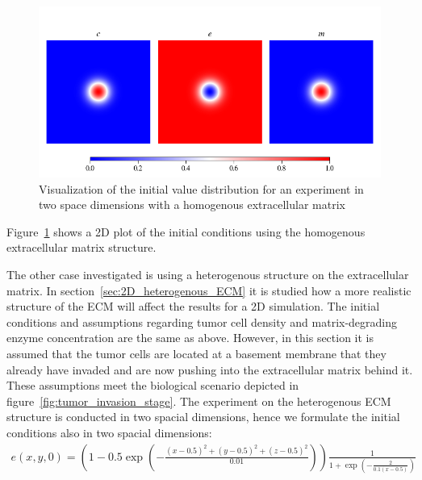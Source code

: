\begin{figure}[ht!]
    \centering
    \includegraphics[width=\textwidth]{resources/images/2D_initial_conditions_homogenous_ECM.png}
    \caption{Visualization of the initial value distribution for an experiment in two space dimensions with a homogenous extracellular matrix}
    \label{fig:2D_homogenous_ECM_initial}
\end{figure}
Figure~\ref{fig:2D_homogenous_ECM_initial} shows a 2D plot of the initial conditions using the homogenous extracellular matrix structure.

The other case investigated is using a heterogenous structure on the extracellular matrix. In section~\ref{sec:2D_heterogenous_ECM} it is studied how a more realistic structure of the ECM will affect the results for a 2D simulation. The initial conditions and assumptions regarding tumor cell density and matrix-degrading enzyme concentration are the same as above. However, in this section it is assumed that the tumor cells are located at a basement membrane that they already have invaded and are now pushing into the extracellular matrix behind it. These assumptions meet the biological scenario depicted in figure~\ref{fig:tumor_invasion_stage}. The experiment on the heterogenous ECM structure is conducted in two spacial dimensions, hence we formulate the initial conditions also in two spacial dimensions:
\begin{align*}
    e(x,y,0) = (1 - 0.5 \exp(-\frac{(x-0.5)^2+(y-0.5)^2+(z-0.5)^2}{0.01}))\frac{1}{1+\exp(-\frac{2}{0.1 (x-0.5)})}
\end{align*}

